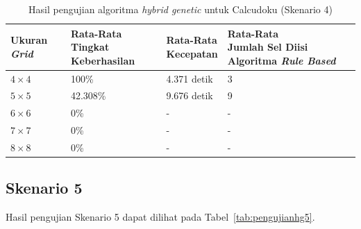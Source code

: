 \begin{table}
\centering
\captionsetup{justification=centering}
\caption[Hasil pengujian algoritma \textit{hybrid genetic} untuk Calcudoku (Skenario 4)]{Hasil pengujian algoritma \textit{hybrid genetic} untuk Calcudoku (Skenario 4)}
\begin{tabular}{| l | l | l | l |}
\hline
Ukuran \textit{Grid} & \makecell[c]{Rata-Rata \\ Tingkat Keberhasilan} & \makecell[c]{Rata-Rata \\ Kecepatan} & \makecell[c]{Rata-Rata \\ Jumlah Sel Diisi Algoritma \textit{Rule Based}} \\
\hline \hline
\begin{math}4 \times 4\end{math} & 100\% & 4.371 detik & 3 \\
\hline
\begin{math}5 \times 5\end{math} & 42.308\% & 9.676 detik & 9 \\
\hline
\begin{math}6 \times 6\end{math} & 0\% & - & - \\
\hline
\begin{math}7 \times 7\end{math} & 0\% & - & - \\
\hline
\begin{math}8 \times 8\end{math} & 0\% & - & - \\
\hline
\end{tabular}
\label{tab:pengujianhg4}
\end{table}

\clearpage

\subsection{Skenario 5}
\label{sec:skenario5}

Hasil pengujian Skenario 5 dapat dilihat pada Tabel~\ref{tab:pengujianhg5}.

